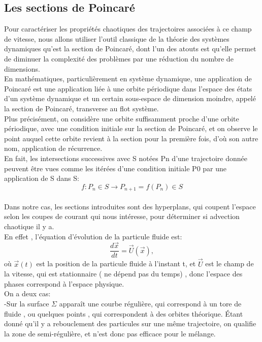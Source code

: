 \documentclass[a4paper,12pt,titlepage]{report}
\begin{document}
\begin{onehalfspace}
\subsection{Les sections de Poincaré}
Pour caractériser les propriétés chaotiques des trajectoires associées à ce champ de vitesse, nous allons utiliser l'outil classique de la théorie des systèmes dynamiques qu'est la section de Poincaré, dont l'un des atouts est qu'elle permet de diminuer la complexité des problèmes par une réduction du nombre de dimensions. 
\\
En mathématiques, particulièrement en système dynamique, une application de Poincaré est une application liée à une orbite périodique dans l'espace des états d’un système dynamique et un certain sous-espace de dimension moindre, appelé la section de Poincaré, transverse au  flot système.\\
 Plus précisément, on considère une orbite suffisamment proche d'une orbite périodique, avec une condition initiale sur la section de Poincaré, et on observe le point auquel cette orbite revient à la section pour la première fois, d'où son autre nom, application de récurrence.
\\
En fait, les intersections successives avec S notées Pn d'une trajectoire donnée peuvent être vues comme les itérées d'une condition initiale P0 par une application de S dans S:
\\
\[f: P_n \in S \to P_{n+1} = f(P_n) \in S \]
\\
Dans notre cas, les sections introduites sont des hyperplans, qui coupent l'espace selon les coupes de courant qui nous intéresse, pour déterminer si advection chaotique il y a.
\\
En effet , l'équation d'évolution de la particule fluide est:
\\
\[ \frac{d\vec{x}}{dt} = \vec{U}(\vec{x}), \]
où $\vec{x}(t)$ est la position de la particule fluide à l'instant t, et $\vec{U}$ est le champ de la vitesse, qui est stationnaire ( ne dépend pas du temps) , donc l'espace des phases correspond à l'espace physique. 
\\
On a deux cas:
\\
-Sur la surface $\Sigma $ apparaît une courbe régulière, qui correspond à un tore de fluide , ou quelques points , qui correspondent à des orbites théorique. Étant donné qu'il y a rebouclement des particules sur une même trajectoire, on qualifie la zone de semi-régulière, et n'est donc pas efficace pour le mélange. 
\\


\end{onehalfspace}
\end{document}

